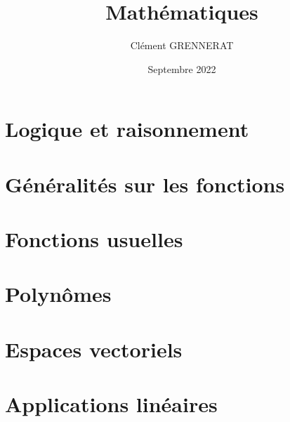 \documentclass[13pt, twoside, a4paper, french]{report}
\newcommand*{\getSubject}{Mathématiques}
\begin{document}
\title{\getSubject}
\author{Clément GRENNERAT}
\date{Septembre 2022}
\pagestyle{non-chapter-style}


\chapter{Logique et raisonnement}\label{ch:logique-et-raisonnement}
  


\chapter{Généralités sur les fonctions}\label{ch:generalites-sur-les-fonctions}
  


\chapter{Fonctions usuelles}\label{ch:fonctions-usuelles}
  


\chapter{Polynômes}\label{ch:polynomes}
  


\chapter{Espaces vectoriels}\label{ch:espaces-vectoriels}
  


\chapter{Applications linéaires}\label{ch:applications-lineaires}
  
\end{document}
